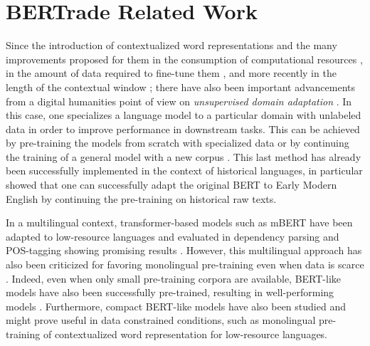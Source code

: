 \chapter{BERTrade Related Work}

\label{sec-related}
Since the introduction of contextualized word representations \citep{peters-etal-2018-deep,akbik-etal-2018-contextual,devlin-etal-2019-bert} and the many improvements proposed for them in the consumption of computational resources \citep{clark-etal-2020-electra}, in the amount of data required to fine-tune them \citep{raffel-etal-2020-exploring}, and more recently in the length of the contextual window \citep{xiong-etal-2021-nystromformer}; there have also been important advancements from a digital humanities point of view on \emph{unsupervised domain adaptation} \citep{ramponi-plank-2020-neural}. In this case, one specializes a language model to a particular domain with unlabeled data in order to improve performance in downstream tasks. This can be achieved by  pre-training the models from scratch with specialized data \citep{beltagy-etal-2019-scibert} or by continuing the training of a general model with a new corpus \citep{lee-etal-2019-BioBERT, peng-etal-2019-transfer}. This last method has already been successfully implemented in the context of historical languages, in particular \citet{han-eisenstein-2019-unsupervised} showed that one can successfully adapt the original BERT \citep{devlin-etal-2019-bert} to Early Modern English by continuing the pre-training on historical raw texts.

In a multilingual context, transformer-based models such as mBERT have been adapted to low-resource languages and evaluated in dependency parsing and POS-tagging showing promising results \citep{chau-etal-2020-parsing, muller-etal-2021-unseen, gururangan-etal-2020-dont, wang-etal-2020-extending}. However, this multilingual approach has also been criticized for favoring monolingual pre-training even when data is scarce \citep{virtanen-etal-2019-multilingual, ortiz-suarez-etal-2020-monolingual}. Indeed, even when only small pre-training corpora are available, BERT-like models have also been successfully pre-trained, resulting in well-performing models \citep{micheli-etal-2020-importance}. Furthermore, compact BERT-like models have also been studied \citep{turc-etal-2019-well} and might prove useful in data constrained conditions, such as monolingual pre-training of contextualized word representation for low-resource languages.

